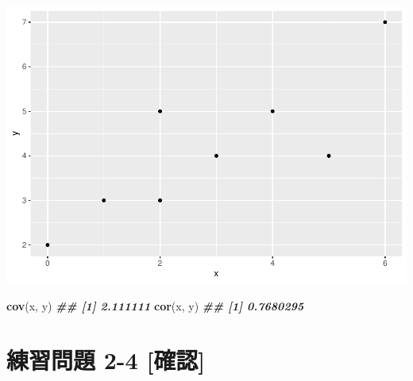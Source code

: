 \documentclass[
]{book}
\newenvironment{Shaded}{\begin{snugshade}}{\end{snugshade}}
\newcommand{\AttributeTok}[1]{\textcolor[rgb]{0.13,0.29,0.53}{#1}}
\newcommand{\DocumentationTok}[1]{\textcolor[rgb]{0.56,0.35,0.01}{\textbf{\textit{#1}}}}
\newcommand{\FunctionTok}[1]{\textcolor[rgb]{0.13,0.29,0.53}{\textbf{#1}}}
\newcommand{\NormalTok}[1]{#1}
\newcommand{\OtherTok}[1]{\textcolor[rgb]{0.56,0.35,0.01}{#1}}
\newcommand{\SpecialCharTok}[1]{\textcolor[rgb]{0.81,0.36,0.00}{\textbf{#1}}}
\newcommand{\StringTok}[1]{\textcolor[rgb]{0.31,0.60,0.02}{#1}}
\begin{document}
\begin{Shaded}
\end{Shaded}

\includegraphics{_main_files/figure-latex/unnamed-chunk-8-1.pdf}

\begin{Shaded}
\begin{Highlighting}[]

\FunctionTok{cov}\NormalTok{(x, y)}
\DocumentationTok{\#\# [1] 2.111111}
\FunctionTok{cor}\NormalTok{(x, y)}
\DocumentationTok{\#\# [1] 0.7680295}
\end{Highlighting}
\end{Shaded}

\hypertarget{ux7df4ux7fd2ux554fux984c-2-4-ux78baux8a8d}{%
\section*{練習問題 2-4 {[}確認{]}}\label{ux7df4ux7fd2ux554fux984c-2-4-ux78baux8a8d}}
\end{document}
